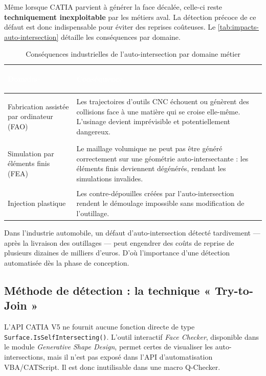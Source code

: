 Même lorsque CATIA parvient à générer la face décalée, celle-ci reste \textbf{techniquement inexploitable} par les métiers aval. La détection précoce de ce défaut est donc indispensable pour éviter des reprises coûteuses. Le \autoref{tab:impacts-auto-intersection} détaille les conséquences par domaine.

\begin{table}[H]
    \centering
    \caption{Conséquences industrielles de l'auto-intersection par domaine métier}
    \label{tab:impacts-auto-intersection}
    \begin{tabularx}{\textwidth}{|>{\bfseries\raggedright\arraybackslash}p{3.8cm}|X|}
        \hline
        \rowcolor{headerblue}
        \textcolor{white}{\textbf{Domaine}} & \centering\textcolor{white}{\textbf{Conséquence}} \tabularnewline
        \hline
        \rowcolor{rowlight}
        Fabrication assistée par ordinateur (FAO) & Les trajectoires d'outils CNC échouent ou génèrent des collisions face à une matière qui se croise elle-même. L'usinage devient imprévisible et potentiellement dangereux. \\
        \hline
        \rowcolor{rowwhite}
        Simulation par éléments finis (FEA) & Le maillage volumique ne peut pas être généré correctement sur une géométrie auto-intersectante : les éléments finis deviennent dégénérés, rendant les simulations invalides. \\
        \hline
        \rowcolor{rowlight}
        Injection plastique & Les contre-dépouilles créées par l'auto-intersection rendent le démoulage impossible sans modification de l'outillage. \\
        \hline
    \end{tabularx}
\end{table}

\begin{block}[note]
Dans l'industrie automobile, un défaut d'auto-intersection détecté tardivement --- après la livraison des outillages --- peut engendrer des coûts de reprise de plusieurs dizaines de milliers d'euros. D'où l'importance d'une détection automatisée dès la phase de conception.
\end{block}

\subsection{Méthode de détection : la technique « Try-to-Join »}

L'API CATIA V5 ne fournit aucune fonction directe de type \texttt{Surface.IsSelfIntersecting()}. L'outil interactif \textit{Face Checker}, disponible dans le module \textit{Generative Shape Design}, permet certes de visualiser les auto-intersections, mais il n'est pas exposé dans l'API d'automatisation VBA/CATScript. Il est donc inutilisable dans une macro Q-Checker.

